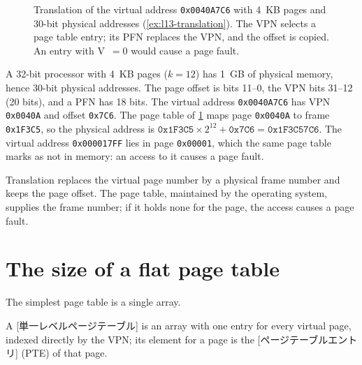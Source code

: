 \documentclass[../main.tex]{subfiles}
\begin{document}
\begin{figure}[htbp]
  \centering
  
  \caption{Translation of the virtual address \texttt{0x0040A7C6} with 4~KB
    pages and 30-bit physical addresses (\cref{ex:l13-translation}).  The VPN
    selects a page table entry; its PFN replaces the VPN, and the offset is
    copied.  An entry with V~$=0$ would cause a page fault.}
  \label{fig:l13-translation}
\end{figure}

\begin{example}
  \label{ex:l13-translation}
  A 32-bit processor with 4~KB pages ($k = 12$) has 1~GB of physical memory,
  hence 30-bit physical addresses.  The page offset is bits 11--0, the VPN
  bits 31--12 (20 bits), and a PFN has 18 bits.  The virtual address
  \texttt{0x0040A7C6} has VPN \texttt{0x0040A} and offset \texttt{0x7C6}.  The
  page table of \cref{fig:l13-translation} maps page \texttt{0x0040A} to frame
  \texttt{0x1F3C5}, so the physical address is
  $\texttt{0x1F3C5} \times 2^{12} + \texttt{0x7C6} = \texttt{0x1F3C57C6}$.
  The virtual address \texttt{0x000017FF} lies in page \texttt{0x00001}, which
  the same page table marks as not in memory: an access to it causes a page
  fault.
\end{example}


\begin{keypoint}
  Translation replaces the virtual page number by a physical frame number and
  keeps the page offset.  The page table, maintained by the operating system,
  supplies the frame number; if it holds none for the page, the access causes
  a page fault.
\end{keypoint}

\section{The size of a flat page table}
\label{sec:l13-flat}

The simplest page table is a single array.

\begin{definition}
  A [単一レベルページテーブル] is an array with one
  entry for every virtual page, indexed directly by the VPN; its element for a
  page is the [ページテーブルエントリ]%
   (PTE) of that page.
\end{definition}
\end{document}
